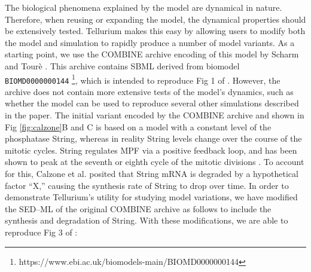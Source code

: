 \documentclass[10pt,letterpaper]{article}
\begin{document}
The biological phenomena explained by the model are dynamical in nature. Therefore, when reusing or expanding the model, the dynamical properties should be extensively tested. Tellurium makes this easy by allowing users to modify both the model and simulation to rapidly produce a number of model variants. As a starting point, we use the COMBINE archive encoding of this model by Scharm and Tour\`{e} \cite{scharmShowcase}. This archive contains SBML derived from biomodel \texttt{BIOMD0000000144} \footnote{https://www.ebi.ac.uk/biomodels-main/BIOMD0000000144}, which is intended to reproduce Fig 1 of \cite{calzone2007dynamical}. However, the archive does not contain more extensive tests of the model's dynamics, such as whether the model can be used to reproduce several other simulations described  in the paper. The initial variant encoded by the COMBINE archive and shown in Fig \ref{fig:calzone}B and C is based on a model with a constant level of the phosphatase String, whereas in reality String levels change over the course of the mitotic cycles. String regulates MPF via a positive feedback loop, and has been shown to peak at the seventh or eighth cycle of the mitotic divisions \cite{calzone2007dynamical}. To account for this, Calzone et al. \cite{calzone2007dynamical} posited that String mRNA is degraded by a hypothetical factor ``X,'' causing the synthesis rate of String to drop over time.
In order to demonstrate Tellurium's utility for studying model variations, we have modified the SED--ML of the original COMBINE archive \cite{scharmShowcase} as follows to include the synthesis and degradation of String. With these modifications, we are able to reproduce Fig 3 of \cite{calzone2007dynamical}:
\end{document}
